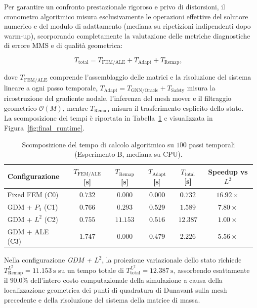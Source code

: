 \label{subsec:runtime_analysis}

Per garantire un confronto prestazionale rigoroso e privo di distorsioni, il cronometro algoritmico misura esclusivamente le operazioni effettive del solutore numerico e del modulo di adattamento (mediana su ripetizioni indipendenti dopo warm-up), scorporando completamente la valutazione delle metriche diagnostiche di errore MMS e di qualità geometrica:

\begin{equation}
T_{\mathrm{total}}
=
T_{\mathrm{FEM/ALE}}
+
T_{\mathrm{Adapt}}
+
T_{\mathrm{Remap}},
\label{eq:runtime_decomposition}
\end{equation}

dove $T_{\mathrm{FEM/ALE}}$ comprende l'assemblaggio delle matrici e la risoluzione del sistema lineare a ogni passo temporale, $T_{\mathrm{Adapt}} = T_{\mathrm{GNN/Oracle}} + T_{\mathrm{Safety}}$ misura la ricostruzione del gradiente nodale, l'inferenza del mesh mover e il filtraggio geometrico $\mathcal{O}(M)$, mentre $T_{\mathrm{Remap}}$ misura il trasferimento esplicito dello stato. La scomposizione dei tempi è riportata in Tabella~\ref{tab:final_runtime_table} e visualizzata in Figura~\ref{fig:final_runtime}.

\begin{table}[htbp]
\centering
\small
\setlength{\tabcolsep}{4.5pt}
\caption{Scomposizione del tempo di calcolo algoritmico su $100$ passi temporali (Esperimento B, mediana su CPU).}
\label{tab:final_runtime_table}
\begin{tabular*}{\linewidth}{@{\extracolsep{\fill}}lccccc@{}}
\toprule
Configurazione & $T_{\mathrm{FEM/ALE}}$ [s] & $T_{\mathrm{Remap}}$ [s] & $T_{\mathrm{Adapt}}$ [s] & $T_{\mathrm{total}}$ [s] & Speedup vs $L^2$ \\
\midrule
Fixed FEM (C0)    & $0.732$ & $0.000$  & $0.000$ & $0.732$  & $16.92\times$ \\
GDM + $P_1$ (C1)  & $0.766$ & $0.293$  & $0.529$ & $1.589$  & $7.80\times$  \\
GDM + $L^2$ (C2)  & $0.755$ & $11.153$ & $0.516$ & $12.387$ & $1.00\times$  \\
GDM + ALE (C3)    & $1.747$ & $0.000$  & $0.479$ & $2.226$  & $\mathbf{5.56\times}$ \\
\bottomrule
\end{tabular*}
\end{table}

Nella configurazione \textit{GDM + $L^2$}, la proiezione variazionale dello stato richiede $T_{\mathrm{Remap}}^{L^2} = 11.153\ \mathrm{s}$ su un tempo totale di $T_{\mathrm{total}}^{L^2} = 12.387\ \mathrm{s}$, assorbendo esattamente il $90.0\%$ dell'intero costo computazionale della simulazione a causa della localizzazione geometrica dei punti di quadratura di Dunavant sulla mesh precedente e della risoluzione del sistema della matrice di massa.


